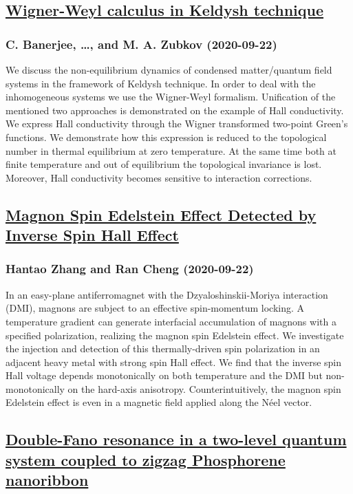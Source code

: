{\subsection*{\href{http://arxiv.org/abs/2009.10704v1}{Wigner-Weyl calculus in Keldysh technique}}
\subsubsection*{C. Banerjee, \dots, and M. A. Zubkov (2020-09-22)}
We discuss the non-equilibrium dynamics of condensed matter/quantum field
systems in the framework of Keldysh technique. In order to deal with the
inhomogeneous systems we use the Wigner-Weyl formalism. Unification of the
mentioned two approaches is demonstrated on the example of Hall conductivity.
We express Hall conductivity through the Wigner transformed two-point Green's
functions. We demonstrate how this expression is reduced to the topological
number in thermal equilibrium at zero temperature. At the same time both at
finite temperature and out of equilibrium the topological invariance is lost.
Moreover, Hall conductivity becomes sensitive to interaction corrections.

\subsection*{\href{http://arxiv.org/abs/2009.10703v1}{Magnon Spin Edelstein Effect Detected by Inverse Spin Hall Effect}}
\subsubsection*{Hantao Zhang and Ran Cheng (2020-09-22)}
In an easy-plane antiferromagnet with the Dzyaloshinskii-Moriya interaction
(DMI), magnons are subject to an effective spin-momentum locking. A temperature
gradient can generate interfacial accumulation of magnons with a specified
polarization, realizing the magnon spin Edelstein effect. We investigate the
injection and detection of this thermally-driven spin polarization in an
adjacent heavy metal with strong spin Hall effect. We find that the inverse
spin Hall voltage depends monotonically on both temperature and the DMI but
non-monotonically on the hard-axis anisotropy. Counterintuitively, the magnon
spin Edelstein effect is even in a magnetic field applied along the N\'eel
vector.

\subsection*{\href{http://arxiv.org/abs/2009.10699v1}{Double-Fano resonance in a two-level quantum system coupled to zigzag  Phosphorene nanoribbon}}
}
